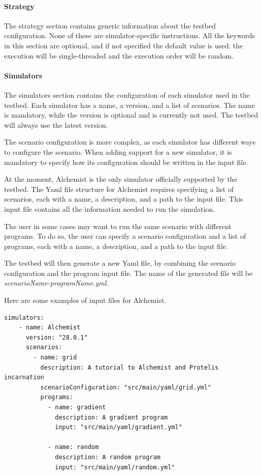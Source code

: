 \documentclass[12pt,a4paper,openright,twoside]{book}
\begin{document}
\paragraph*{Strategy} The strategy section contains generic information about the testbed configuration. None of these 
are simulator-specific instructions.
All the keywords in this section are optional, and if not specified the default value is used: the execution will be
single-threaded and the execution order will be random.

\paragraph*{Simulators} The simulators section contains the configuration of each simulator used in the testbed.
Each simulator has a name, a version, and a list of scenarios. The name is mandatory, while the version is optional 
and is currently not used. The testbed will always use the latest version.

The scenario configuration is more complex, as each simulator has different ways to configure the scenario.
When adding support for a new simulator, it is mandatory to specify how its configuration should be written in the input file.

At the moment, Alchemist is the only simulator officially supported by the testbed.
The Yaml file structure for Alchemist requires specifying a list of scenarios, each with a name, a description, and a path to the input file.
This input file contains all the information needed to run the simulation.

The user in some cases may want to run the same scenario with different programs.
To do so, the user can specify a scenario configuration and a list of programs, each with a name, a description, and a path to the input file.

The testbed will then generate a new Yaml file, by combining the scenario configuration and the program input file. 
The name of the generated file will be \textit{scenarioName-programName.yml}.

Here are some examples of input files for Alchemist.

\begin{lstlisting}[style=yaml, caption={Two programs to be tested in the same scenario}]
  simulators:
    - name: Alchemist
      version: "28.0.1"
      scenarios:
        - name: grid
          description: A tutorial to Alchemist and Protelis incarnation
          scenarioConfiguration: "src/main/yaml/grid.yml"
          programs:
            - name: gradient
              description: A gradient program
              input: "src/main/yaml/gradient.yml"
  
            - name: random
              description: A random program
              input: "src/main/yaml/random.yml"
  \end{lstlisting}
\end{document}
